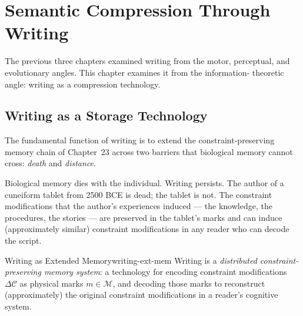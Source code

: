 \chapter{Semantic Compression Through Writing}



The previous three chapters examined writing from the motor, perceptual,
and evolutionary angles. This chapter examines it from the information-
theoretic angle: writing as a compression technology.

\section{Writing as a Storage Technology}

The fundamental function of writing is to extend the constraint-preserving
memory chain of Chapter~23 across two barriers that biological memory
cannot cross: \emph{death} and \emph{distance}.

Biological memory dies with the individual. Writing persists. The author
of a cuneiform tablet from 2500 BCE is dead; the tablet is not. The
constraint modifications that the author's experiences induced — the
knowledge, the procedures, the stories — are preserved in the tablet's
marks and can induce (approximately similar) constraint modifications
in any reader who can decode the script.

\begin{definition}{Writing as Extended Memory}{writing-ext-mem}
  Writing is a \emph{distributed constraint-preserving memory system}:
  a technology for encoding constraint modifications $\Delta\mathcal{C}$
  as physical marks $m \in \mathcal{M}$, and decoding those marks
  to reconstruct (approximately) the original constraint modifications
  in a reader's cognitive system.
\end{definition}

